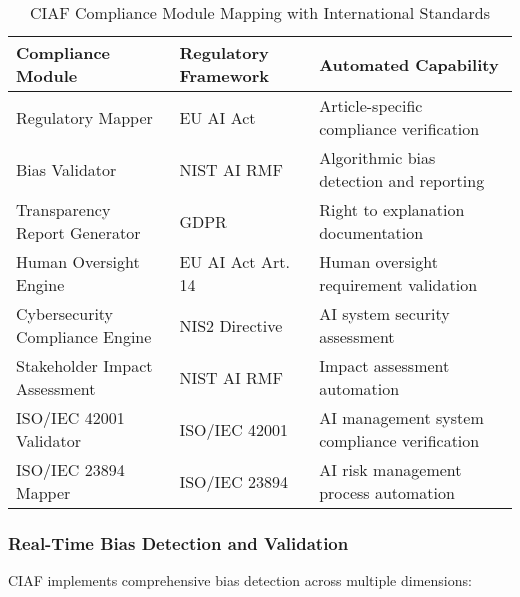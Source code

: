 \documentclass[12pt,a4paper]{article}
\begin{document}
\begin{table}[H]
\centering
\footnotesize
\renewcommand{\arraystretch}{1.3}
\begin{tabular}{|>{\raggedright\arraybackslash}p{3.8cm}|>{\raggedright\arraybackslash}p{2.7cm}|>{\raggedright\arraybackslash}p{6cm}|}
\hline
\textbf{Compliance Module} & \textbf{Regulatory Framework} & \textbf{Automated Capability} \\
\hline
Regulatory Mapper & EU AI Act & Article-specific compliance verification \\
\hline
Bias Validator & NIST AI RMF & Algorithmic bias detection and reporting \\
\hline
Transparency Report Generator & GDPR & Right to explanation documentation \\
\hline
Human Oversight Engine & EU AI Act Art. 14 & Human oversight requirement validation \\
\hline
Cybersecurity Compliance Engine & NIS2 Directive & AI system security assessment \\
\hline
Stakeholder Impact Assessment & NIST AI RMF & Impact assessment automation \\
\hline
ISO/IEC 42001 Validator & ISO/IEC 42001 & AI management system compliance verification \\
\hline
ISO/IEC 23894 Mapper & ISO/IEC 23894 & AI risk management process automation \\
\hline
\end{tabular}
\caption{CIAF Compliance Module Mapping with International Standards}
\end{table}

\subsubsection{Real-Time Bias Detection and Validation}

CIAF implements comprehensive bias detection across multiple dimensions:
\end{document}
